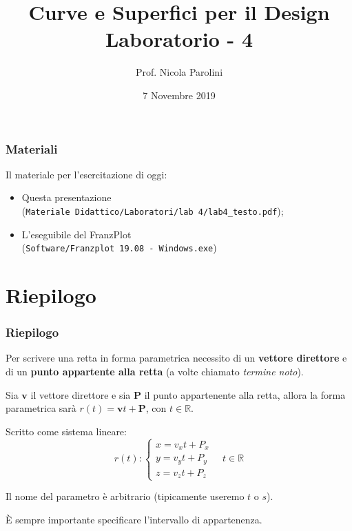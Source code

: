 \documentclass{beamer}
\title[Curve e Sup. - Lab 3]{Curve e Superfici per il Design \\ Laboratorio - 4}
\author[Prof. Parolini]{Prof. Nicola Parolini}
\date{7 Novembre 2019}
\newcommand{\frnzplt}{FranzPlot }
\begin{document}
\begin{frame}
\maketitle
\end{frame}

\begin{frame}
\frametitle{Materiali}
Il materiale per l'esercitazione di oggi:
\begin{itemize}
\item Questa presentazione \\ (\texttt{Materiale Didattico/Laboratori/lab 4/lab4\_testo.pdf});
\item L'eseguibile del \frnzplt \\ (\texttt{Software/Franzplot 19.08 - Windows.exe})
\end{itemize}
\end{frame}


\section{Riepilogo}

\begin{frame}
\frametitle{Riepilogo}
    Per scrivere una retta in forma parametrica necessito di un \textbf{vettore direttore}
    e di un \textbf{punto appartente alla retta} (a volte chiamato \textit{termine noto}).

    \vspace{0.2cm}
    Sia $\mathbf v$ il vettore direttore e sia $\mathbf P$ il punto appartenente alla retta,
    allora la forma parametrica sar\`a $r(t) = \mathbf v t + \mathbf P$, con $t\in \mathbb{R}$.
    
    Scritto come sistema lineare:
\begin{displaymath}
    r(t) :\begin{cases} x = v_x t + P_x\\ y = v_y t + P_y \\z = v_z t + P_z \end{cases}
\quad t\in \mathbb{R}
\end{displaymath}

    \vspace{0.2cm}
    Il nome del parametro \`e arbitrario (tipicamente useremo $t$ o $s$).
    
    \`E sempre importante specificare l'intervallo di appartenenza.
\end{frame}
\end{document}
